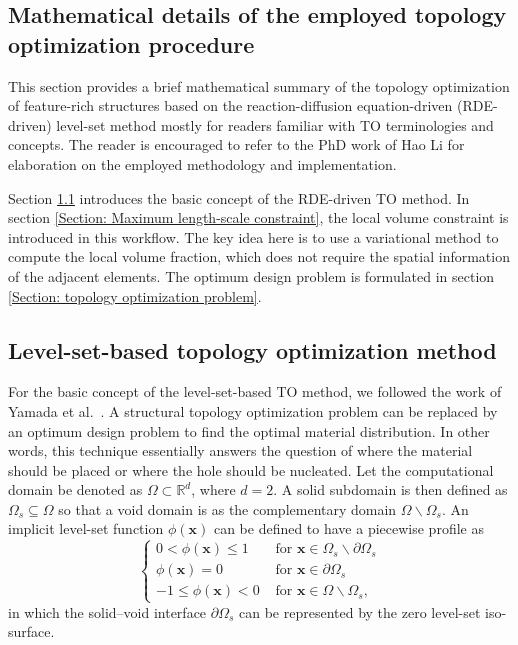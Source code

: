 \begin{subappendices}

\section[Mathematical details of the topology optimization]{Mathematical details of the employed topology optimization procedure}


This section provides a brief mathematical summary of the topology optimization of feature-rich structures based on the reaction-diffusion equation-driven (\gls{RDE}-driven) level-set method mostly for readers familiar with \gls{TO} terminologies and concepts. The reader is encouraged to refer to the PhD work of Hao Li \cite{Li2022Thesis} for elaboration on the employed methodology and implementation.

Section \ref{Section: level-set-based topology optimization method} introduces the basic concept of the \gls{RDE}-driven \gls{TO} method. In section \ref{Section: Maximum length-scale constraint}, the local volume constraint is introduced in this workflow. The key idea here is to use a variational method to compute the local volume fraction, which does not require the spatial information of the adjacent elements. The optimum design problem is formulated in section \ref{Section: topology optimization problem}.


\subsection{Level-set-based topology optimization method}\label{Section: level-set-based topology optimization method}
For the basic concept of the level-set-based \gls{TO} method, we followed the work of Yamada et al.\ \cite{yamada2010topology}. A structural topology optimization problem can be replaced by an optimum design problem to find the optimal material distribution. In other words, this technique essentially answers the question of where the material should be placed or where the hole should be nucleated. Let the computational domain be denoted as $\Omega \subset \mathbb{R}^d$, where $d=2$. A solid subdomain is then defined as $\Omega_{s} \subseteq \Omega$ so that a void domain is as the complementary domain $\Omega \backslash \Omega_{s}$. An implicit level-set function $\phi \left(\boldsymbol{x}\right)$ can be defined to have a piecewise profile as
\begin{equation}
	\left\{\begin{array}{ll}
		{0<\phi(\boldsymbol{x}) \leq 1} & {\text { for } \boldsymbol{x} \in \Omega_{s} \backslash \partial \Omega_{s}} \\
		{\phi(\boldsymbol{x})=0} & {\text { for } \boldsymbol{x} \in \partial \Omega_{s}} \\
		{-1 \leq \phi(\boldsymbol{x})<0} & {\text { for } \boldsymbol{x} \in \Omega \backslash \Omega_{s}},
	\end{array}\right.
\end{equation}
in which the solid--void interface $\partial \Omega_{s}$ can be represented by the zero level-set iso-surface.


\end{subappendices}
